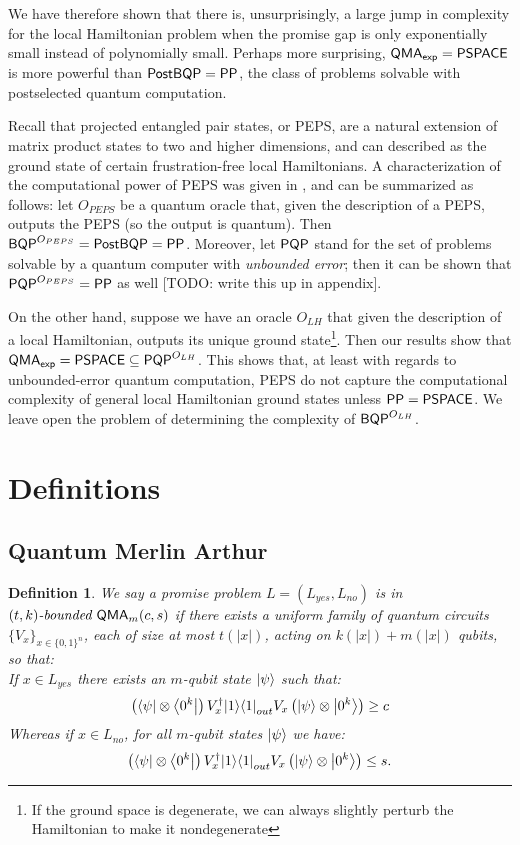 \documentclass[11pt]{article}
\newtheorem{definition}{Definition}
\theoremstyle{definition}
\theoremstyle{remark}
\newcommand\QMA{{\sf{QMA}}}
\newcommand\PSPACE{{\sf{PSPACE}}}
\newcommand\PP{\sf{PP}}
\newcommand\BQP{{\sf{BQP}}}
\newcommand\PostBQP{{\sf{PostBQP}}}
\newcommand\PQP{{\sf{PQP}}}
\newcommand\QMAexp{{\sf{QMA}_{exp}}}
\newcommand\bddQMA[5]{{\left(#1,#2\right)}\textit{-bounded }\QMA_{#3}(#4,#5)}
\begin{document}
We have therefore shown that there is, unsurprisingly, a large jump in complexity for the local Hamiltonian problem when the promise gap is only exponentially small instead of polynomially small. Perhaps more surprising, $\QMAexp = \PSPACE$ is more powerful than $\PostBQP=\PP$, the class of problems solvable with postselected quantum computation.

Recall that projected entangled pair states, or PEPS, are a natural extension of matrix product states to two and higher dimensions, and can described as the ground state of certain frustration-free local Hamiltonians. A characterization of the computational power of PEPS was given in \cite{swv07}, and can be summarized as follows: let $O_{PEPS}$ be a quantum oracle that, given the description of a PEPS, outputs the PEPS (so the output is quantum). Then $\BQP^{O_{PEPS}} = \PostBQP = \PP$. Moreover, let $\PQP$ stand for the set of problems solvable by a quantum computer with \emph{unbounded error}; then it can be shown that $\PQP^{O_{PEPS}} = \PP$ as well [TODO: write this up in appendix].

On the other hand, suppose we have an oracle $O_{LH}$ that given the description of a local Hamiltonian, outputs its unique ground state\footnote{If the ground space is degenerate, we can always slightly perturb the Hamiltonian to make it nondegenerate}. Then our results show that $\QMAexp = \PSPACE \subseteq \PQP^{O_{LH}}$. This shows that, at least with regards to unbounded-error quantum computation, PEPS do not capture the computational complexity of general local Hamiltonian ground states unless $\PP=\PSPACE$. We leave open the problem of determining the complexity of $\BQP^{O_{LH}}$.

\section{Definitions}

\subsection{Quantum Merlin Arthur}\label{def:qma}
\begin{definition}We say a promise problem $L=(L_{yes},L_{no})$ is in $\bddQMA{t}{k}{m}{c}{s}$ if there exists a uniform family of quantum circuits $\{ V_x\}_{x\in\{0,1\}^n}$, each of size at most $t(|x|)$, acting on $k(|x|)+m(|x|)$ qubits, so that:\\

If $x \in L_{yes}$ there exists an $m$-qubit state ${\left\vert{\psi}\right\rangle}$ such that:
\begin{equation}
\left({\left\langle{\psi}\right\vert}\otimes {\left\langle{0^k}\right\vert}\right) V^\dagger_x {\left\vert{1}\right\rangle}{\left\langle{1}\right\vert}_{out} V_x \left({\left\vert{\psi}\right\rangle}\otimes {\left\vert{0^k}\right\rangle}\right) \ge c
\end{equation}
Whereas if $x \in L_{no}$, for all $m$-qubit states ${\left\vert{\psi}\right\rangle}$ we have:
\begin{equation}
\left({\left\langle{\psi}\right\vert}\otimes {\left\langle{0^k}\right\vert}\right) V^\dagger_x {\left\vert{1}\right\rangle}{\left\langle{1}\right\vert}_{out} V_x \left({\left\vert{\psi}\right\rangle}\otimes {\left\vert{0^k}\right\rangle}\right) \le s.
\end{equation}

  \end{definition}
\end{document}

